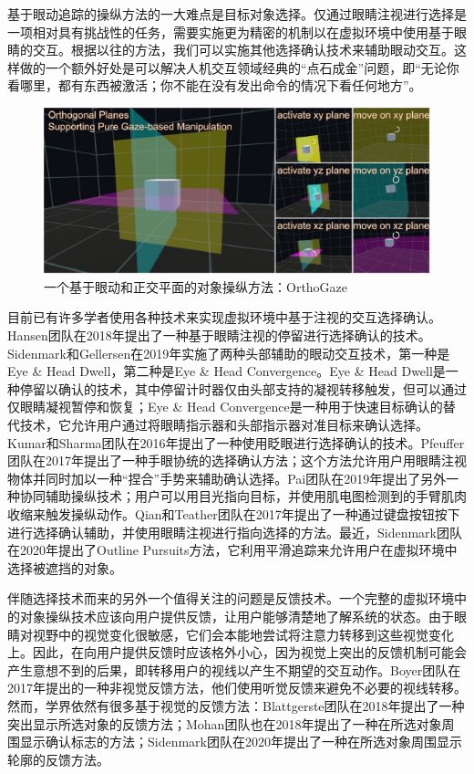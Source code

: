 基于眼动追踪的操纵方法的一大难点是目标对象选择。仅通过眼睛注视进行选择是一项相对具有挑战性的任务，需要实施更为精密的机制以在虚拟环境中使用基于眼睛的交互。根据以往的方法，我们可以实施其他选择确认技术来辅助眼动交互。这样做的一个额外好处是可以解决人机交互领域经典的“点石成金”问题，即“无论你看哪里，都有东西被激活；你不能在没有发出命令的情况下看任何地方”。

\begin{figure}[t!]
    \centering
    \includegraphics[width=.7\textwidth]{figure/orthogaze.jpg}
    \caption{一个基于眼动和正交平面的对象操纵方法：OrthoGaze}
    \label{fig-7}
\end{figure}

目前已有许多学者使用各种技术来实现虚拟环境中基于注视的交互选择确认。Hansen团队在2018年提出了一种基于眼睛注视的停留进行选择确认的技术。Sidenmark和Gellersen在2019年实施了两种头部辅助的眼动交互技术，第一种是Eye \& Head Dwell，第二种是Eye \& Head Convergence。Eye \& Head Dwell是一种停留以确认的技术，其中停留计时器仅由头部支持的凝视转移触发，但可以通过仅眼睛凝视暂停和恢复；Eye \& Head Convergence是一种用于快速目标确认的替代技术，它允许用户通过将眼睛指示器和头部指示器对准目标来确认选择。Kumar和Sharma团队在2016年提出了一种使用眨眼进行选择确认的技术。Pfeuffer团队在2017年提出了一种手眼协统的选择确认方法；这个方法允许用户用眼睛注视物体并同时加以一种“捏合”手势来辅助确认选择。Pai团队在2019年提出了另外一种协同辅助操纵技术；用户可以用目光指向目标，并使用肌电图检测到的手臂肌肉收缩来触发操纵动作。Qian和Teather团队在2017年提出了一种通过键盘按钮按下进行选择确认辅助，并使用眼睛注视进行指向选择的方法。最近，Sidenmark团队在2020年提出了Outline Pursuits方法，它利用平滑追踪来允许用户在虚拟环境中选择被遮挡的对象。

伴随选择技术而来的另外一个值得关注的问题是反馈技术。一个完整的虚拟环境中的对象操纵技术应该向用户提供反馈，让用户能够清楚地了解系统的状态。由于眼睛对视野中的视觉变化很敏感，它们会本能地尝试将注意力转移到这些视觉变化上。因此，在向用户提供反馈时应该格外小心，因为视觉上突出的反馈机制可能会产生意想不到的后果，即转移用户的视线以产生不期望的交互动作。Boyer团队在2017年提出的一种非视觉反馈方法，他们使用听觉反馈来避免不必要的视线转移。然而，学界依然有很多基于视觉的反馈方法：Blattgerste团队在2018年提出了一种突出显示所选对象的反馈方法；Mohan团队也在2018年提出了一种在所选对象周围显示确认标志的方法；Sidenmark团队在2020年提出了一种在所选对象周围显示轮廓的反馈方法。

